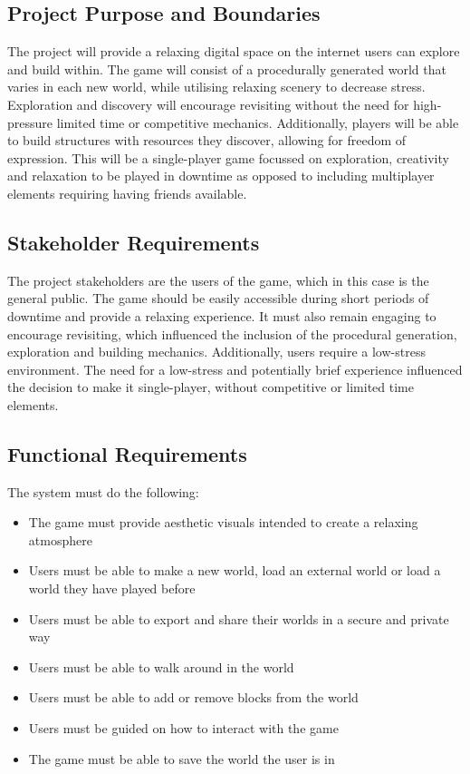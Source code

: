 \documentclass[14pt]{article}
\begin{document}
\subsection{Project Purpose and Boundaries}
The project will provide a relaxing digital space on the internet users can explore and build within. The game will consist of a procedurally generated world that varies in each new world, while utilising relaxing scenery to decrease stress. Exploration and discovery will encourage revisiting without the need for high-pressure limited time or competitive mechanics. Additionally, players will be able to build structures with resources they discover, allowing for freedom of expression. This will be a single-player game focussed on exploration, creativity and relaxation to be played in downtime as opposed to including multiplayer elements requiring having friends available.

\subsection{Stakeholder Requirements}
The project stakeholders are the users of the game, which in this case is the general public. The game should be easily accessible during short periods of downtime and provide a relaxing experience. It must also remain engaging to encourage revisiting, which influenced the inclusion of the procedural generation, exploration and building mechanics. Additionally, users require a low-stress environment. The need for a low-stress and potentially brief experience influenced the decision to make it single-player, without competitive or limited time elements.

\subsection{Functional Requirements}
The system must do the following:
\begin{itemize}
  \item The game must provide aesthetic visuals intended to create a relaxing atmosphere
  \item Users must be able to make a new world, load an external world or load a world they have played before
  \item Users must be able to export and share their worlds in a secure and private way
  \item Users must be able to walk around in the world
  \item Users must be able to add or remove blocks from the world
  \item Users must be guided on how to interact with the game
  \item The game must be able to save the world the user is in
\end{itemize}
\end{document}
